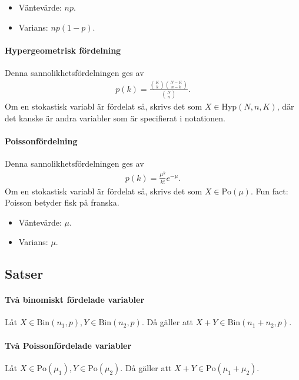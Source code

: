 \begin{itemize}
	\item Väntevärde: $np$.
	\item Varians: $np(1 - p)$.
\end{itemize}

\paragraph{Hypergeometrisk fördelning}
Denna sannolikhetsfördelningen ges av
\begin{align*}
	p(k) = \frac{\binom{K}{k}\binom{N - K}{n - k}}{\binom{N}{n}}.
\end{align*}
Om en stokastisk variabl är fördelat så, skrivs det som $X\in\text{Hyp}(N, n, K)$, där det kanske är andra variabler som är specifierat i notationen.

\paragraph{Poissonfördelning}
Denna sannolikhetsfördelningen ges av
\begin{align*}
	p(k) = \frac{\mu^k}{k!}e^{-\mu}.
\end{align*}
Om en stokastisk variabl är fördelat så, skrivs det som $X\in\text{Po}(\mu)$. Fun fact: Poisson betyder fisk på franska.

\begin{itemize}
	\item Väntevärde: $\mu$.
	\item Varians: $\mu$.
\end{itemize}

\subsection{Satser}

\paragraph{Två binomiskt fördelade variabler}
Låt $X\in\text{Bin}(n_1, p), Y\in\text{Bin}(n_2, p)$. Då gäller att $X + Y\in\text{Bin}(n_1 + n_2, p)$.

\proof

\paragraph{Två Poissonfördelade variabler}
Låt $X\in\text{Po}(\mu_1), Y\in\text{Po}(\mu_2)$. Då gäller att $X + Y\in\text{Po}(\mu_1 + \mu_2)$.

\proof
